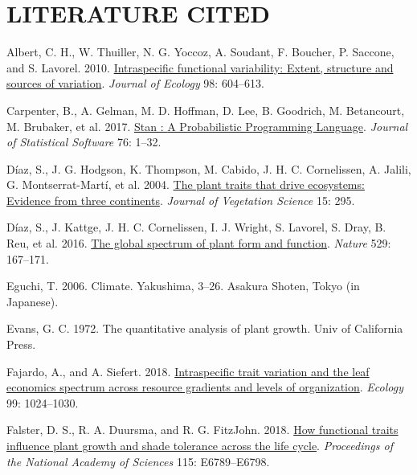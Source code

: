 \documentclass[
  12pt,
  a4paper,
,tablecaptionabove
]{scrartcl}
\newlength{\cslhangindent}
\newenvironment{CSLReferences}[2] %
 {%
  \setlength{\parindent}{0pt}
  \ifodd #1 \everypar{\setlength{\hangindent}{\cslhangindent}}\ignorespaces\fi
  \ifnum #2 > 0
  \setlength{\parskip}{#2\baselineskip}
  \fi
 }%
 {}
\begin{document}
\hypertarget{literature-cited}{%
\section{LITERATURE CITED}\label{literature-cited}}

\hypertarget{refs}{}
\begin{CSLReferences}{1}{0}
\leavevmode{}%
Albert, C. H., W. Thuiller, N. G. Yoccoz, A. Soudant, F. Boucher, P. Saccone, and S. Lavorel. 2010. \href{https://doi.org/10.1111/j.1365-2745.2010.01651.x}{Intraspecific functional variability: {Extent}, structure and sources of variation}. \emph{Journal of Ecology} 98: 604--613.

\leavevmode{}%
Carpenter, B., A. Gelman, M. D. Hoffman, D. Lee, B. Goodrich, M. Betancourt, M. Brubaker, et al. 2017. \href{https://doi.org/10.18637/jss.v076.i01}{Stan : {A Probabilistic Programming Language}}. \emph{Journal of Statistical Software} 76: 1--32.

\leavevmode{}%
Díaz, S., J. G. Hodgson, K. Thompson, M. Cabido, J. H. C. Cornelissen, A. Jalili, G. Montserrat-Martí, et al. 2004. \href{https://doi.org/10.1658/1100-9233(2004)015\%5B0295:TPTTDE\%5D2.0.CO;2}{The plant traits that drive ecosystems: {Evidence} from three continents}. \emph{Journal of Vegetation Science} 15: 295.

\leavevmode{}%
Díaz, S., J. Kattge, J. H. C. Cornelissen, I. J. Wright, S. Lavorel, S. Dray, B. Reu, et al. 2016. \href{https://doi.org/10.1038/nature16489}{The global spectrum of plant form and function}. \emph{Nature} 529: 167--171.

\leavevmode{}%
Eguchi, T. 2006. Climate. Yakushima, 3--26. {Asakura Shoten}, {Tokyo (in Japanese)}.

\leavevmode{}%
Evans, G. C. 1972. The quantitative analysis of plant growth. {Univ of California Press}.

\leavevmode{}%
Fajardo, A., and A. Siefert. 2018. \href{https://doi.org/10.1002/ecy.2194}{Intraspecific trait variation and the leaf economics spectrum across resource gradients and levels of organization}. \emph{Ecology} 99: 1024--1030.

\leavevmode{}%
Falster, D. S., R. A. Duursma, and R. G. FitzJohn. 2018. \href{https://doi.org/10.1073/pnas.1714044115}{How functional traits influence plant growth and shade tolerance across the life cycle}. \emph{Proceedings of the National Academy of Sciences} 115: E6789--E6798.


\end{CSLReferences}
\end{document}
